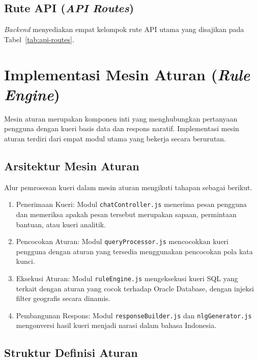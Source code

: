 \subsection{Rute API (\textit{API Routes})}

\textit{Backend} menyediakan empat kelompok rute API utama yang disajikan pada Tabel~\ref{tab:api-routes}.



\section{Implementasi Mesin Aturan (\textit{Rule Engine})}
\label{sec:impl-rule-engine}

Mesin aturan merupakan komponen inti yang menghubungkan pertanyaan pengguna dengan kueri basis data dan respons naratif. Implementasi mesin aturan terdiri dari empat modul utama yang bekerja secara berurutan.

\subsection{Arsitektur Mesin Aturan}

Alur pemrosesan kueri dalam mesin aturan mengikuti tahapan sebagai berikut.

\begin{enumerate}
    \item Penerimaan Kueri: Modul \texttt{chatController.js} menerima pesan pengguna dan memeriksa apakah pesan tersebut merupakan sapaan, permintaan bantuan, atau kueri analitik.
    \item Pencocokan Aturan: Modul \texttt{queryProcessor.js} mencocokkan kueri pengguna dengan aturan yang tersedia menggunakan pencocokan pola kata kunci.
    \item Eksekusi Aturan: Modul \texttt{ruleEngine.js} mengeksekusi kueri SQL yang terkait dengan aturan yang cocok terhadap Oracle Database, dengan injeksi filter geografis secara dinamis.
    \item Pembangunan Respons: Modul \texttt{responseBuilder.js} dan \texttt{nlgGenerator.js} mengonversi hasil kueri menjadi narasi dalam bahasa Indonesia.
\end{enumerate}

\subsection{Struktur Definisi Aturan}


